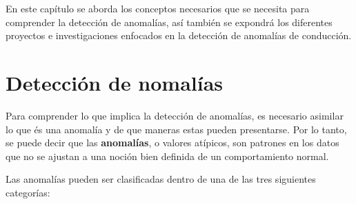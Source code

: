 En este cap\'{i}tulo se aborda los conceptos necesarios que se necesita para comprender la detecci\'{o}n de anomal\'{i}as, as\'{i} tambi\'{e}n se expondr\'{a} los diferentes proyectos e investigaciones enfocados en la detecci\'{o}n de anomal\'{i}as de conducci\'{o}n. 
 
\section{Detecci\'{o}n de nomal\'{i}as}

Para comprender lo que implica la detecci\'{o}n de anomal\'{i}as, es necesario asimilar lo que \'{e}s una anomal\'{i}a y de que maneras estas pueden presentarse. Por lo tanto, se puede decir que las \textbf{anomalías}, o valores at\'{i}picos, son patrones en los datos que no se ajustan a una noción bien definida de un comportamiento normal.

\vspace{5mm} %

Las anomal\'{i}as pueden ser clasificadas dentro de una de las tres siguientes categor\'{i}as:

